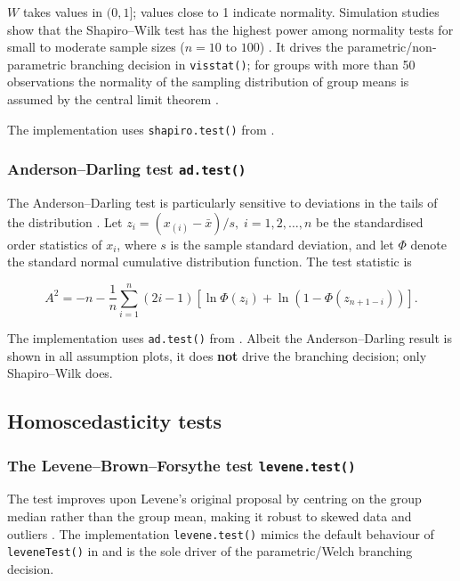\(W\) takes values in \((0, 1]\); values close to 1 indicate normality.
Simulation studies show that the Shapiro--Wilk test has the highest
power among normality tests for small to moderate sample sizes (\(n = 10\)
to \(100\)) \citep{Razali:2011}. It drives the parametric/non-parametric
branching decision in \texttt{visstat()}; for groups with more than 50
observations the normality of the sampling distribution of group means is assumed by the central limit theorem
\citep{Lumley:2002, Rasch:2011}.

The implementation uses \texttt{shapiro.test()} from  \citep{R:2026}.

\subsubsection{\texorpdfstring{Anderson--Darling test \texttt{ad.test()}}{Anderson--Darling test ad.test()}}\label{adar}

The Anderson--Darling test \citep{Anderson:1952} is particularly sensitive to
deviations in the tails of the distribution \citep{Razali:2011, Yap:2011}.
Let \(z_i = (x_{(i)} - \bar{x})/s,\; i=1,2,\ldots,n\) be the standardised order statistics of \(x_i\),
where \(s\) is the sample standard deviation, and let \(\Phi\) denote the standard normal cumulative
distribution function. The test statistic is

\[A^2 = -n - \frac{1}{n}\sum_{i=1}^{n}(2i-1)
        \left[\ln\Phi(z_i) + \ln\!\left(1 - \Phi(z_{n+1-i})\right)\right].\]

The implementation uses \texttt{ad.test()} from 
\citep{Gross:2015}. Albeit the Anderson--Darling result is shown in all assumption
plots, it does \textbf{not} drive the branching decision; only Shapiro--Wilk
does.

\subsection{Homoscedasticity tests}\label{homo}

\subsubsection{\texorpdfstring{The Levene--Brown--Forsythe test \texttt{levene.test()}}{The Levene--Brown--Forsythe test levene.test()}}\label{lev}

The test \citep{Brown:1974} improves upon Levene's original proposal
\citep{Levene:1960} by centring on the group median rather than the group
mean, making it robust to skewed data and outliers \citep{Allingham:2012}.
The implementation \texttt{levene.test()} mimics the default behaviour of
\texttt{leveneTest()} in  \citep{Fox:2019} and is the sole driver of
the parametric/Welch branching decision.

